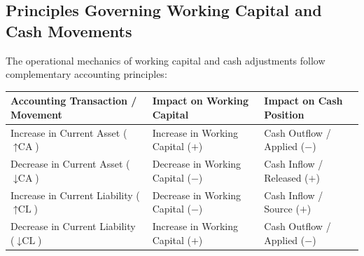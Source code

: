 \subsection{Principles Governing Working Capital and Cash Movements}
The operational mechanics of working capital and cash adjustments follow complementary accounting principles:

\begin{center}
\small
\renewcommand{\arraystretch}{1.2}
\begin{tabularx}{\linewidth}{>{\raggedright\arraybackslash}X >{\centering\arraybackslash}p{4.2cm} >{\centering\arraybackslash}p{4.2cm}}
\toprule
\textbf{Accounting Transaction / Movement} & \textbf{Impact on Working Capital} & \textbf{Impact on Cash Position} \\
\midrule
Increase in Current Asset ($\uparrow \text{CA}$) & Increase in Working Capital ($+$) & Cash Outflow / Applied ($-$) \\
Decrease in Current Asset ($\downarrow \text{CA}$) & Decrease in Working Capital ($-$) & Cash Inflow / Released ($+$) \\
Increase in Current Liability ($\uparrow \text{CL}$) & Decrease in Working Capital ($-$) & Cash Inflow / Source ($+$) \\
Decrease in Current Liability ($\downarrow \text{CL}$) & Increase in Working Capital ($+$) & Cash Outflow / Applied ($-$) \\
\bottomrule
\end{tabularx}
\end{center}

